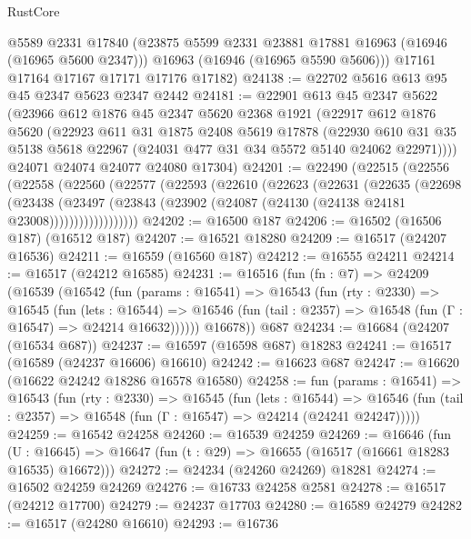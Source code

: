 \begin{lexlean}{RustCore}
\begin{coremodule}
        @5589
        @2331
        @17840
        (@23875 @5599 @2331 @23881 @17881 @16963 (@16946 (@16965 @5600 @2347)))
        @16963
        (@16946 (@16965 @5590 @5606)))
      @17161
      @17164
      @17167
      @17171
      @17176
      @17182)
@24138 := @22702 @5616 @613 @95 @45 @2347 @5623 @2347 @2442
@24181 := @22901
    @613
    @45
    @2347
    @5622
    (@23966
      @612
      @1876
      @45
      @2347
      @5620
      @2368
      @1921
      (@22917
        @612
        @1876
        @5620
        (@22923
          @611
          @31
          @1875
          @2408
          @5619
          @17878
          (@22930 @610 @31 @35 @5138 @5618 @22967 (@24031 @477 @31 @34 @5572 @5140 @24062 @22971))))
      @24071
      @24074
      @24077
      @24080
      @17304)
@24201 := @22490
    (@22515
      (@22556
        (@22558
          (@22560
            (@22577
              (@22593
                (@22610
                  (@22623
                    (@22631
                      (@22635
                        (@22698
                          (@23438
                            (@23497
                              (@23843
                                (@23902 (@24087 (@24130 (@24138 @24181 @23008))))))))))))))))))
@24202 := @16500 @187
@24206 := @16502 (@16506 @187) (@16512 @187)
@24207 := @16521 @18280
@24209 := @16517 (@24207 @16536)
@24211 := @16559 (@16560 @187)
@24212 := @16555 @24211
@24214 := @16517 (@24212 @16585)
@24231 := @16516
    (fun (fn : @7) =>
    @24209
      (@16539
        (@16542
          (fun (params : @16541) =>
          @16543
            (fun (rty : @2330) =>
            @16545
              (fun (lets : @16544) =>
              @16546 (fun (tail : @2357) => @16548 (fun (Γ : @16547) => @24214 @16632))))))
        @16678))
    @687
@24234 := @16684 (@24207 (@16534 @687))
@24237 := @16597 (@16598 @687) @18283
@24241 := @16517 (@16589 (@24237 @16606) @16610)
@24242 := @16623 @687
@24247 := @16620 (@16622 @24242 @18286 @16578 @16580)
@24258 := fun (params : @16541) =>
  @16543
    (fun (rty : @2330) =>
    @16545
      (fun (lets : @16544) =>
      @16546 (fun (tail : @2357) => @16548 (fun (Γ : @16547) => @24214 (@24241 @24247)))))
@24259 := @16542 @24258
@24260 := @16539 @24259
@24269 := @16646
    (fun (U : @16645) => @16647 (fun (t : @29) => @16655 (@16517 (@16661 @18283 @16535) @16672)))
@24272 := @24234 (@24260 @24269) @18281
@24274 := @16502 @24259 @24269
@24276 := @16733 @24258 @2581
@24278 := @16517 (@24212 @17700)
@24279 := @24237 @17703
@24280 := @16589 @24279
@24282 := @16517 (@24280 @16610)
@24293 := @16736

\end{coremodule}
\end{lexlean}

